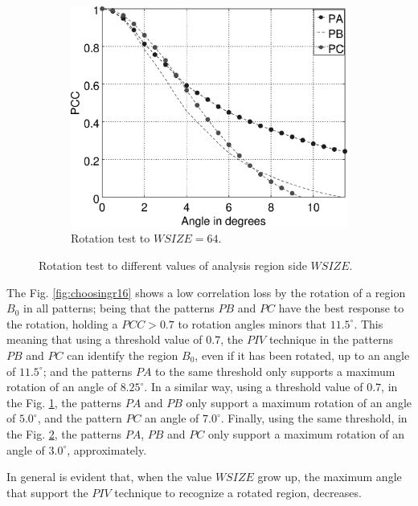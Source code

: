 \begin{figure}[H]
\begin{subfigure}[b]{0.45\textwidth}
    \label{fig:choosingr32}
  \end{subfigure}
  \begin{subfigure}[b]{0.45\textwidth}
    \includegraphics[width=\textwidth]{image_rot_plot-64.eps}
    \vspace{2pt}
    \caption{Rotation test to $WSIZE=64$.}
    \label{fig:choosingr64}
  \end{subfigure}
  \caption{Rotation test to different values of analysis region side $WSIZE$.}
  \label{fig:RotationAll}
\end{figure}

The Fig. \ref{fig:choosingr16} shows a low correlation loss by the 
rotation of a region $B_0$ in all patterns; being that the patterns $PB$ and $PC$ have
the best response to the rotation, holding a $PCC>0.7$ to rotation angles minors that $11.5^\circ$.
This meaning that using a threshold value of $0.7$, the $PIV$ technique in the patterns $PB$ and $PC$
can identify the region $B_0$, even if it has been rotated, up to an angle of $11.5^\circ$;
and the patterns $PA$ to the same threshold only supports a maximum rotation of an angle of $8.25^\circ$.
In a similar way, using a threshold value of $0.7$, in the Fig. \ref{fig:choosingr32},
the patterns $PA$ and $PB$ only support a maximum rotation of an angle of $5.0^\circ$, and
the pattern $PC$ an angle of $7.0^\circ$.
Finally, using the same threshold, in the Fig. \ref{fig:choosingr64},
the patterns $PA$, $PB$ and $PC$ only support a maximum rotation of an angle of $3.0^\circ$, approximately.

In general is evident that, when the value $WSIZE$ grow up, the maximum angle that support the
$PIV$ technique to recognize a rotated region, decreases.


